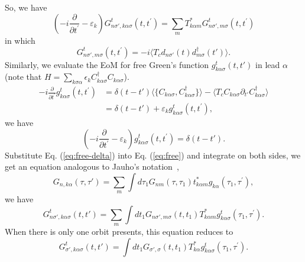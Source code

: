 \documentclass[11pt,a4paper]{article}
\begin{document}
So, we have
\begin{equation}
(-i \frac{\partial}{\partial t^{\prime}} -\varepsilon_{k})G_{n\sigma',k\alpha\sigma}^{t} \left(t,t^{\prime}\right)= \sum_{m} T_{k\alpha m}^{*} G_{n\sigma',m\sigma}^{t}(t,t^{\prime})
\label{eq:free}
\end{equation}
in which
\begin{equation}
G_{n\sigma',m\sigma}^{t}(t,t^{\prime}) = -i\langle T_{c}d_{n\sigma'}(t)d_{m\sigma}^{\dag}(t')\rangle.
\end{equation}
Similarly, we evaluate the EoM for free Green's function $g_{k\alpha\sigma}^{t}(t,t')$ in lead $\alpha$ (note that $H=\sum_{k\sigma\alpha} \epsilon_{k} C_{k \alpha \sigma}^{\dag} C_{k \alpha \sigma}$).
\begin{equation}
\begin{split}
-i \frac{\partial}{\partial t^{\prime}} g_{k\alpha\sigma}^{t} \left(t,t^{\prime}\right)&= \delta(t-t')\langle \{C_{k\alpha\sigma}, C_{k\alpha\sigma}^{\dag}\}\rangle - \langle T_{c}C_{k\alpha\sigma}\partial_{t'}C_{k\alpha\sigma}^{\dag}\rangle \\
&=\delta(t-t') + \varepsilon_{k} g_{k\alpha\sigma}^{t}\left(t,t^{\prime}\right),
\end{split}
\end{equation}
we have
\begin{equation}
(-i \frac{\partial}{\partial t^{\prime}}-\varepsilon_{k}) g_{k\alpha\sigma}^{t} \left(t,t^{\prime}\right)=\delta(t-t').
\label{eq:free-delta}
\end{equation}
Substitute Eq. (\ref{eq:free-delta}) into Eq. (\ref{eq:free}) and integrate on both sides, we get an equation analogous to Jauho's notation~\cite{Jauho},
\begin{equation}
G_{n,k\alpha}(\tau,\tau')=\sum_{m} \int d \tau_{1} G_{n m}\left(\tau, \tau_{1}\right) t_{k \alpha m}^{*} g_{k \alpha}\left(\tau_{1}, \tau^{\prime}\right),
\nonumber
\end{equation}
we have
\begin{equation}
G_{n\sigma',k\alpha\sigma}^{t}(t,t')=\sum_{m}\int d t_{1} G_{n\sigma',m\sigma}\left(t, t_{1}\right) T_{k \alpha m}^{*} g_{k \alpha\sigma}^{t}\left(\tau_{1}, \tau^{\prime}\right).
\end{equation}
When there is only one orbit presents, this equation reduces to
\begin{equation}
G_{\sigma',k\alpha\sigma}^{t}(t,t')=\int d t_{1} G_{\sigma',\sigma}\left(t, t_{1}\right) T_{k \alpha}^{*} g_{k \alpha\sigma}^{t}\left(\tau_{1}, \tau^{\prime}\right).
\end{equation}
\end{document}
